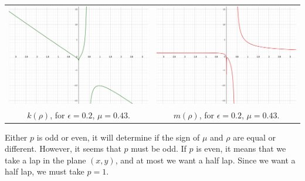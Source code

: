 \documentclass[a4paper,preprint,11pt]{article}
\begin{document}
\begin{center}
\begin{tabular}{cc}
    \includegraphics[scale=1]{Slow_Passage/k_rho.png} &
    \includegraphics[scale=1]{Slow_Passage/m_rho.png} \\
    $k(\rho)$, for $\epsilon=0.2$, $\mu=0.43$. & $m(\rho)$, for $\epsilon=0.2$, $\mu=0.43$.
\end{tabular}    
\end{center}

Either $p$ is odd or even, it will determine if the sign of $\mu$ and $\rho$ are equal or different. However, it seems that $p$ must be odd. If $p$ is even, it means that we take a lap in the plane $(x,y)$, and at most we want a half lap. Since we want a half lap, we must take $p=1$. %
\end{document}
